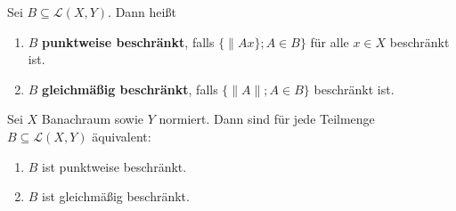 
\begin{defi}[Beschränktheit]
Sei $B\subseteq \mathcal L(X, Y)$. Dann heißt
\begin{enumerate}
\item $B$ \textbf{punktweise beschränkt}, falls $\{\|Ax\};A\in B\}$ für alle $x\in X$ beschränkt ist.
\item $B$ \textbf{gleichmäßig beschränkt}, falls $\{\|A\|; A\in B\}$ beschränkt ist.
\end{enumerate}
\end{defi}

\begin{fsatz}[PGB]\cite{banasiak_arlotti_2006}\label{Satz von PGB}
Sei $X$ Banachraum sowie $Y$ normiert. Dann sind für jede Teilmenge $B\subseteq\mathcal L(X,Y)$ äquivalent:
\begin{enumerate}
\item $B$ ist punktweise beschränkt.
\item $B$ ist gleichmäßig beschränkt.
\end{enumerate}
\end{fsatz}




